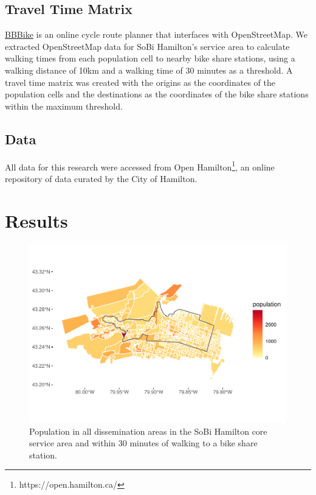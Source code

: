 \documentclass[]{elsarticle} %
\begin{document}
\hypertarget{travel-time-matrix}{%
\subsection{Travel Time Matrix}\label{travel-time-matrix}}

\href{https://download.bbbike.org/osm/bbbike/}{BBBike} is an online
cycle route planner that interfaces with OpenStreetMap. We extracted
OpenStreetMap data for SoBi Hamilton's service area to calculate walking
times from each population cell to nearby bike share stations, using a
walking distance of 10km and a walking time of 30 minutes as a
threshold. A travel time matrix was created with the origins as the
coordinates of the population cells and the destinations as the
coordinates of the bike share stations within the maximum threshold.

\hypertarget{data}{%
\subsection{Data}\label{data}}

All data for this research were accessed from Open Hamilton\footnote{https://open.hamilton.ca/},
an online repository of data curated by the City of Hamilton.

\hypertarget{results}{%
\section{Results}\label{results}}

\begin{figure}

{\centering \includegraphics[width=0.65\linewidth]{Bike-share-spatial-equity_files/figure-latex/figure-2-1} 

}

\caption{Population in all dissemination areas in the SoBi Hamilton core service area and within 30 minutes of walking to a bike share station.}\label{fig:figure-2}
\end{figure}
\end{document}
